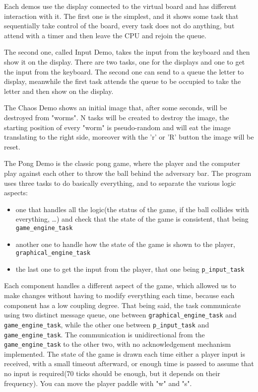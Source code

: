 \documentclass{article}
\begin{document}
Each demos use the display connected to the virtual board and has different interaction with it. The first one is the simplest, and it shows some task that sequentially take control of the board, every task does not do anything, but attend with a timer and then leave the CPU and rejoin the queue.

The second one, called Input Demo, takes the input from the keyboard and then show it on the display. There are two tasks, one for the displays and one to get the input from the keyboard. The second one can send to a queue the letter to display, meanwhile the first task attends the queue to be occupied to take the letter and then show on the display.

The Chaos Demo shows an initial image that, after some seconds, will be destroyed from "worms". N tasks will be created to destroy the image, the starting position of every "worm" is pseudo-random and will eat the image translating to the right side, moreover with the 'r' or 'R' button the image will be reset.

The Pong Demo is the classic pong game, where the player and the computer play against each other to throw the ball behind the adversary bar. The program uses three tasks to do basically everything, and to separate the various logic aspects:
\begin{itemize}
\item one that handles all the logic(the status of the game, if the ball collides with everything, \dots) and check that the state of the game is consistent, that being \texttt{game_engine_task}
\item another one to handle how the state of the game is shown to the player, \texttt{graphical_engine_task}
\item the last one to get the input from the player, that one being \texttt{p_input_task}
\end{itemize}
Each component handles a different aspect of the game, which allowed us to make changes without having to modify everything each time, because each component has a low coupling degree. That being said, the task communicate using two distinct message queue, one between \texttt{graphical_engine_task} and \texttt{game_engine_task}, while the other one between \texttt{p_input_task} and \texttt{game_engine_task}. The communication is unidirectional from the \texttt{game_engine_task} to the other two, with no acknowledgement mechanism implemented. The state of the game is drawn each time either a player input is received, with a small timeout afterward, or enough time is passed to assume that no input is required(70 ticks should be enough, but it depends on their frequency). You can move the player paddle with "w" and "s".
\newpage
\end{document}
